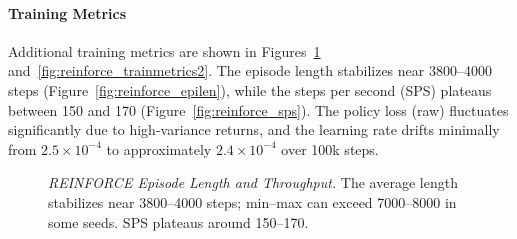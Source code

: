 \paragraph{Training Metrics}
Additional training metrics are shown in Figures~\ref{fig:reinforce_trainmetrics1} and~\ref{fig:reinforce_trainmetrics2}. The episode length stabilizes near 3800–4000 steps (Figure~\ref{fig:reinforce_epilen}), while the steps per second (SPS) plateaus between 150 and 170 (Figure~\ref{fig:reinforce_sps}). The policy loss (raw) fluctuates significantly due to high-variance returns, and the learning rate drifts minimally from $2.5\times10^{-4}$ to approximately $2.4\times10^{-4}$ over 100k steps.
\begin{figure}
	\centering
	\quad
	\caption{\textit{REINFORCE Episode Length and Throughput.} 
		The average length stabilizes near 3800–4000 steps; 
		min–max can exceed 7000–8000 in some seeds. 
		SPS plateaus around 150–170.}
	\label{fig:reinforce_trainmetrics1}
\end{figure}

